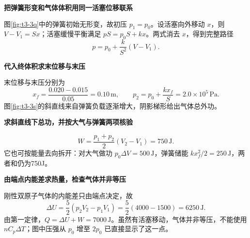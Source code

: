 \begin{solution}\textbf{把弹簧形变和气体体积用同一活塞位移联系}\par\nobreak
图\ref{fig:t3-3q}中的弹簧初始无形变，故初压 $p_1=p_0$。设活塞向外移动 $x$，则 $V-V_1=Sx$；活塞缓慢平衡满足 $pS=p_0S+kx$。两式消去 $x$，得到完整路径
\[p=p_0+\frac{k}{S^2}(V-V_1).\]


\par\medskip{}\noindent\textbf{代入终体积求末位移与末压}\par\nobreak
末位移与末压分别为
\[x_f=\frac{0.020-0.015}{0.05}=0.10\,\mathrm m,\qquad
p_2=p_0+\frac{kx_f}{S}=2.0\times10^5\,\mathrm{Pa}.\]
图\ref{fig:t3-3s}的斜直线来自弹簧负载逐渐增大，阴影梯形给出气体总外功。



\par\medskip{}\noindent\textbf{求斜直线下总功，并按大气与弹簧两项核验}\par\nobreak
\[\boxed{W=\frac{p_1+p_2}{2}(V_2-V_1)=750\,\mathrm J}.\]
它也可按能量去向拆开：对大气做功 $p_0\Delta V=500\,\mathrm J$，弹簧储能 $kx_f^2/2=250\,\mathrm J$，两者和仍为750J。


\par\medskip{}\noindent\textbf{由端点内能差求热量，检查气体并非等压}\par\nobreak
刚性双原子气体的内能差只由端点决定，故
\[\Delta U=\frac52(p_2V_2-p_1V_1)
=\frac52(4000-1500)=6250\,\mathrm J.\]
由第一定律，$\boxed{Q=\Delta U+W=7000\,\mathrm J}$。虽然有活塞移动，气体并非等压，不能使用 $nC_p\Delta T$；图中压强从 $p_0$ 增至 $2p_0$ 已直接显示了这一点。
\end{solution}
